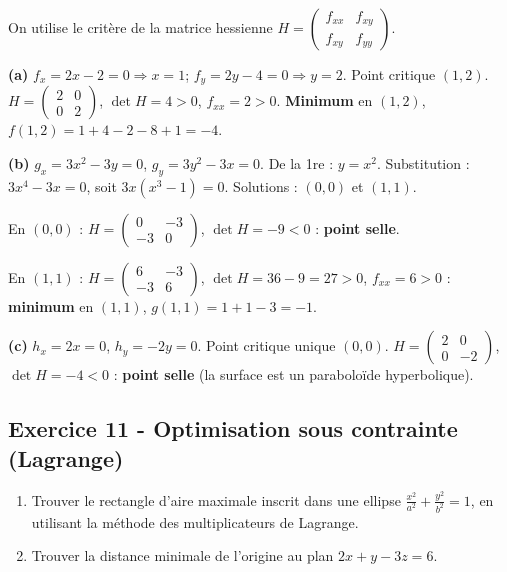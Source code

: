 \documentclass[12pt,a4paper]{article}
\begin{document}
\begin{boitecorrige}
On utilise le critère de la matrice hessienne $H = \begin{pmatrix}f_{xx}&f_{xy}\\f_{xy}&f_{yy}\end{pmatrix}$.

\textbf{(a)} $f_x = 2x-2=0 \Rightarrow x=1$; $f_y = 2y-4=0 \Rightarrow y=2$. Point critique $(1,2)$.
$H = \begin{pmatrix}2&0\\0&2\end{pmatrix}$, $\det H = 4>0$, $f_{xx}=2>0$. \textbf{Minimum} en $(1,2)$, $f(1,2) = 1+4-2-8+1=-4$.

\textbf{(b)} $g_x = 3x^2-3y=0$, $g_y = 3y^2-3x=0$. De la 1re : $y=x^2$. Substitution : $3x^4-3x=0$, soit $3x(x^3-1)=0$. Solutions : $(0,0)$ et $(1,1)$.

En $(0,0)$ : $H = \begin{pmatrix}0&-3\\-3&0\end{pmatrix}$, $\det H = -9<0$ : \textbf{point selle}.

En $(1,1)$ : $H = \begin{pmatrix}6&-3\\-3&6\end{pmatrix}$, $\det H = 36-9=27>0$, $f_{xx}=6>0$ : \textbf{minimum} en $(1,1)$, $g(1,1)=1+1-3=-1$.

\textbf{(c)} $h_x = 2x=0$, $h_y = -2y=0$. Point critique unique $(0,0)$.
$H = \begin{pmatrix}2&0\\0&-2\end{pmatrix}$, $\det H = -4<0$ : \textbf{point selle} (la surface est un paraboloïde hyperbolique).
\end{boitecorrige}

\subsection*{Exercice 11 - Optimisation sous contrainte (Lagrange) \niveau{\difficile}}

\begin{boiteexercice}
\begin{enumerate}
  \item Trouver le rectangle d'aire maximale inscrit dans une ellipse $\frac{x^2}{a^2}+\frac{y^2}{b^2}=1$, en utilisant la méthode des multiplicateurs de Lagrange.
  \item Trouver la distance minimale de l'origine au plan $2x+y-3z=6$.
\end{enumerate}
\end{boiteexercice}
\end{document}
